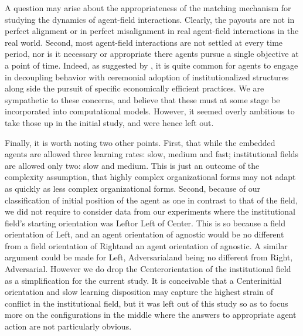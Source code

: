 \documentclass[12pt,letterpaper]{article}
\begin{document}
A question may arise about the appropriateness of the matching mechanism for studying the dynamics of agent-field interactions. Clearly, the payouts are not in perfect alignment or in perfect misalignment in real agent-field interactions in the real world. Second, most agent-field interactions are not settled at every time period, nor is it necessary or appropriate there agents pursue a single objective at a point of time. Indeed, as suggested by \cite{Kostova2008}, it is quite common for agents to engage in decoupling behavior with ceremonial adoption of institutionalized structures along side the pursuit of specific economically efficient practices. We are sympathetic to these concerns, and believe that these must at some stage be incorporated into computational models. However, it seemed overly ambitious to take those up in the initial study, and were hence left out.

Finally, it is worth noting two other points. First, that while the embedded agents are allowed three learning rates: slow, medium and fast; institutional fields are allowed only two: slow and medium. This is just an outcome of the complexity assumption,  that highly complex organizational forms may not adapt as quickly as less complex organizational forms. Second, because of our classification of initial position of the agent as one in contrast to that of the field, we did not require to consider data from our experiments where the institutional field's starting orientation was \textquotesingle Left\textquotesingle  or \textquotesingle Left of Center\textquotesingle . This is so because a field orientation of \textquotesingle Left\textquotesingle , and an agent orientation of agnostic would be no different from a field orientation of \textquotesingle Right\textquotesingle  and an agent orientation of agnostic. A similar argument could be made for \textquotesingle Left, Adversarial\textquotesingle  and being no different from \textquotesingle Right, Adversarial\textquotesingle . However we do drop the \textquotesingle Center\textquotesingle  orientation of the institutional field as a simplification for the current study. It is conceivable that a \textquotesingle Center\textquotesingle  initial orientation and slow learning disposition may capture the highest strain of conflict in the institutional field, but it was left out of this study so as to focus more on the configurations in the middle where the answers to appropriate agent action are not particularly obvious.
\end{document}
